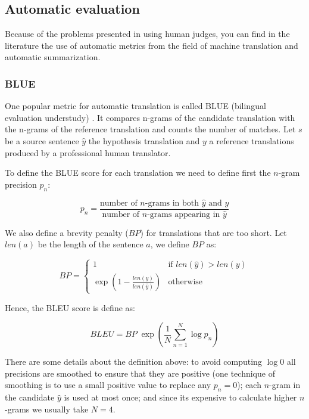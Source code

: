 \subsection{Automatic evaluation}


Because of the problems presented in using human judges, you can find in the literature the use of automatic metrics from the field of machine translation and automatic summarization.

\subsubsection{BLUE}

One popular metric for automatic translation is called BLUE (bilingual evaluation understudy) \cite{Papineni2001}. It compares n-grams of the candidate translation with the n-grams of the reference translation and counts the number of matches. Let $s$ be a source sentence $\hat{y}$ the hypothesis translation and $y$ a reference translations produced by a professional human translator. 

To define the BLUE score for each translation we need to define first the $n$-gram precision $p_n$:

\begin{equation*}
p_n = \frac{\text{number of } n\text{-grams in both } \hat{y} \text{ and } y}{\text{number of } n\text{-grams appearing in } \hat{y}}
\end{equation*}    

We also define a brevity penalty ($BP$) for translations that are too short. Let $len(a)$ be the length of the sentence $a$, we define $BP$ as:

\begin{equation*}
BP=
\begin{cases}
1 & \text{if } len(\hat{y}) > len(y) \\
\exp\left( 1 - \frac{len(y)}{len(\hat{y})} \right) & \text{otherwise}
\end{cases}
\end{equation*} 


Hence, the BLEU score is define as:

\begin{equation*}
BLEU = BP \; \exp \left(\frac{1}{N}  \sum_{n=1}^{N} \log p_n \right)
\end{equation*}

There are some details about the definition above: to avoid computing $\log 0$ all precisions are smoothed to ensure that they are positive (one technique of smoothing is to use a small positive value to replace any $p_n=0$); each $n$-gram in the candidate $\hat{y}$ is used at most once; and since its expensive to calculate higher $n$-grams we usually take $N=4$.

